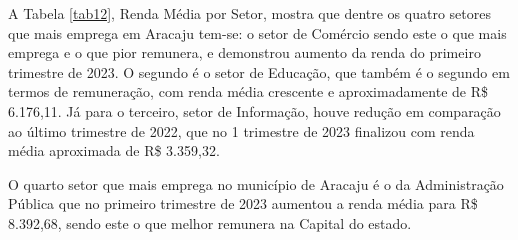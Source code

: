 A Tabela \ref{tab12}, Renda Média por Setor, mostra que dentre os quatro
setores que mais emprega em Aracaju tem-se: o setor de Comércio sendo
este o que mais emprega e o que pior remunera, e demonstrou aumento da
renda do primeiro trimestre de 2023. O segundo é o setor de Educação,
que também é o segundo em termos de remuneração, com renda média
crescente e aproximadamente de R\$ 6.176,11. Já para o terceiro, setor
de Informação, houve redução em comparação ao último trimestre de 2022,
que no 1 trimestre de 2023 finalizou com renda média aproximada de R\$
3.359,32.

O quarto setor que mais emprega no município de Aracaju é o da
Administração Pública que no primeiro trimestre de 2023 aumentou a renda
média para R\$ 8.392,68, sendo este o que melhor remunera na Capital do
estado.

